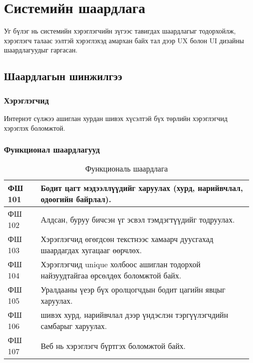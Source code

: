 \chapter{Системийн шаардлага}

Уг бүлэг нь системийн хэрэглэгчийн зүгээс тавигдах шаардлагыг тодорхойлж, хэрэглэгч талаас ээлтэй хэрэглэхэд амархан байх тал дээр UX болон UI дизайны
шаардлагуудыг гаргасан.

\section{Шаардлагын шинжилгээ}

\subsection{Хэрэглэгчид}

Интернэт сүлжээ ашиглан хурдан шивэх хүсэлтэй бүх төрлийн хэрэглэгчид хэрэглэх боломжтой.

\subsection{Функционал шаардлагууд}

\begin{table}[h]
	\centering
	\caption{Функциональ шаардлага}
	\begin{tabular}{ |p{2cm}|p{13cm}| }
		\hline
		ФШ 101 & Бодит цагт мэдээллүүдийг харуулах (хурд, нарийвчлал, одоогийн байрлал).           \\ \hline
		ФШ 102 & Алдсан, буруу бичсэн үг эсвэл тэмдэгтүүдийг тодруулах.                            \\ \hline
		ФШ 103 & Хэрэглэгчид өгөгдсөн текстнээс хамаарч дуусгахад шаардагдах хугацааг өөрчлөх.     \\ \hline
		ФШ 104 & Хэрэглэгчид unique холбоос ашиглан тодорхой найзуудтайгаа өрсөлдөх боломжтой байх. \\ \hline
		ФШ 105 & Уралдааны үеэр бүх оролцогчдын бодит цагийн явцыг харуулах.                        \\ \hline
		ФШ 106 & шивэх хурд, нарийвчлал дээр үндэслэн тэргүүлэгчдийн самбарыг харуулах.             \\  \hline
		ФШ 107 & Веб нь хэрэглэгч бүртгэх боломжтой байх.                                           \\ \hline
	\end{tabular}
\end{table}

